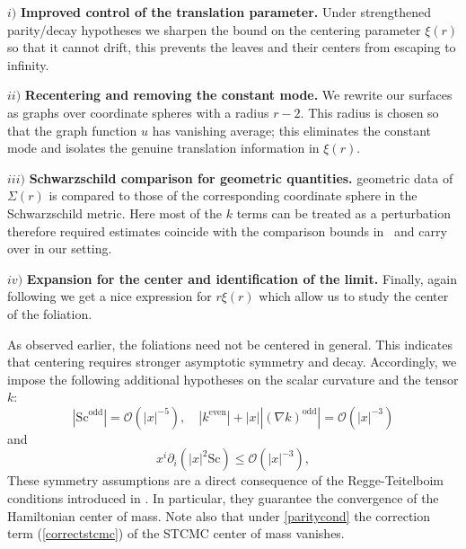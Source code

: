 \documentclass[12pt,a4paper]{amsart}
\theoremstyle{plain}
\theoremstyle{definition}
\begin{document}
$i)$  \textbf{Improved control of the translation parameter.}
  Under strengthened parity/decay hypotheses  we sharpen the bound on the centering parameter \(\xi(r)\) so that it cannot drift, this prevents the leaves and their centers from escaping to infinity.



   $ii)$ \textbf{Recentering and removing the constant mode.} We rewrite our surfaces as graphs over coordinate spheres with a radius $r-2$. This radius is chosen so that the graph function \(u\) has vanishing average; this eliminates the constant mode and isolates the genuine translation information in \(\xi(r)\).
   
  
   
$iii)$  \textbf{Schwarzschild comparison for geometric quantities.}   geometric data of \(\Sigma(r)\) is  compared to those of the corresponding coordinate sphere in the Schwarzschild metric. Here most of the $k$ terms can be treated as a perturbation therefore required estimates coincide with the comparison bounds in~\cite{willcen} and carry over  in our setting.



$iv)$ \textbf{Expansion for the center and identification of the limit.} Finally, again following \cite{willcen} we get a nice expression for $r\xi(r)$ which allow us to study the center of the foliation. 






As observed earlier, the foliations need not be centered in general. This indicates that centering requires stronger asymptotic symmetry and decay. Accordingly, we impose the following additional hypotheses on the scalar curvature and the tensor $k$:  
\begin{equation}\label{paritycond}
   |\mathrm{Sc}^{\text{odd}} |=\mathcal{O} ( |x|^{-5}), \quad  |k^{\text{even}}| + |x||(\nabla k)^{\text{odd}}| = \mathcal{O} (|x|^{-3})
\end{equation}
and 
\begin{equation}
    x^i \partial_i (|x|^2 \mathrm{Sc}) \leq \mathcal{O}( |x|^{-3}),
\end{equation}
 These symmetry assumptions are a direct consequence of the Regge-Teitelboim conditions introduced in \cite{regge1974role}. In particular, they guarantee the convergence of the Hamiltonian center of mass.  Note also that under \eqref{paritycond} the correction term (\ref{correctstcmc}) of the STCMC center of mass vanishes.
\end{document}
